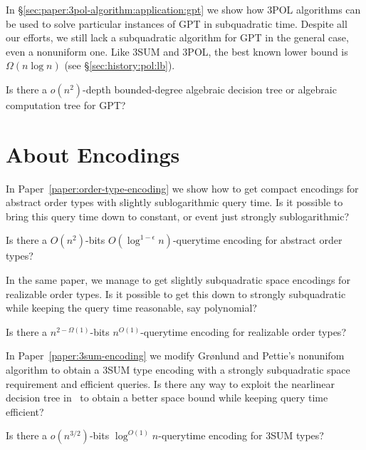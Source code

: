 In \S\ref{sec:paper:3pol-algorithm:application:gpt} we show how 3POL algorithms
can be used to solve particular instances of GPT in subquadratic time.
Despite all our efforts, we still lack a subquadratic algorithm for GPT in the
general case, even a
nonuniform one. Like 3SUM and 3POL, the best known lower bound is \(\Omega(n
\log n)\) (see \S\ref{sec:history:pol:lb}).
\begin{openquestion}
	Is there a \(o(n^2)\)-depth bounded-degree algebraic decision tree or
	algebraic computation tree for GPT?
\end{openquestion}


\section{About Encodings}

In Paper~\ref{paper:order-type-encoding}
we show how to get compact encodings for abstract order types with slightly
sublogarithmic query time. Is it possible to bring this query time down to
constant, or event just strongly sublogarithmic?
%
\begin{openquestion}
	Is there a \(O(n^2)\)-bits \(O(\log^{1-\epsilon} n )\)-querytime encoding for
	abstract order types?
\end{openquestion}

In the same paper,
we manage to get slightly subquadratic space encodings for realizable order
types. Is it possible to get this down to strongly subquadratic while keeping
the query time reasonable, say polynomial?
%
\begin{openquestion}
	Is there a \(n^{2-\Omega(1)}\)-bits \(n^{O(1)}\)-querytime encoding for
	realizable order types?
\end{openquestion}

In Paper~\ref{paper:3sum-encoding}
we modify Gr\o nlund and Pettie's nonunifom algorithm to obtain a 3SUM type
encoding with a strongly subquadratic space requirement and efficient queries.
Is there any way to exploit the nearlinear decision tree in~\cite{KLM18} to
obtain a better space bound while keeping query time efficient?
\begin{openquestion}
	Is there a \(o(n^{3/2})\)-bits \(\log^{O(1)} n\)-querytime encoding for
	3SUM types?
\end{openquestion}

